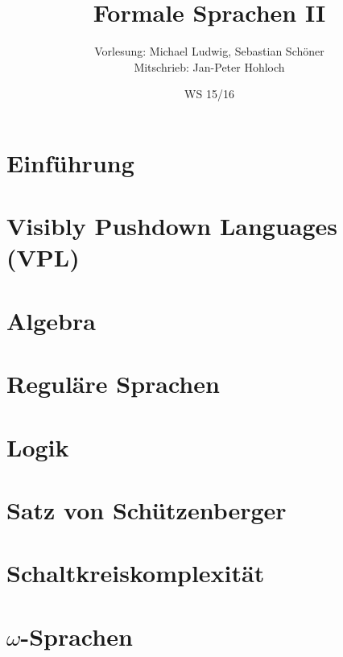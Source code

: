 \documentclass[german,a4paper,10pt]{scrreprt}
\title{Formale Sprachen II}
\author{Vorlesung: Michael Ludwig, Sebastian Schöner\\
Mitschrieb: Jan-Peter Hohloch}
\date{WS 15/16}
\begin{document}
    \maketitle
    \tableofcontents
    \newpage
    \chapter{Einführung}
        
    \chapter{Visibly Pushdown Languages (VPL)}
        
    \chapter{Algebra}
        
    \chapter{Reguläre Sprachen}
        
    \chapter{Logik}
        
    \chapter{Satz von Schützenberger}
        
    \chapter{Schaltkreiskomplexität}
        
    \chapter{$\omega$-Sprachen}
        
\end{document}
